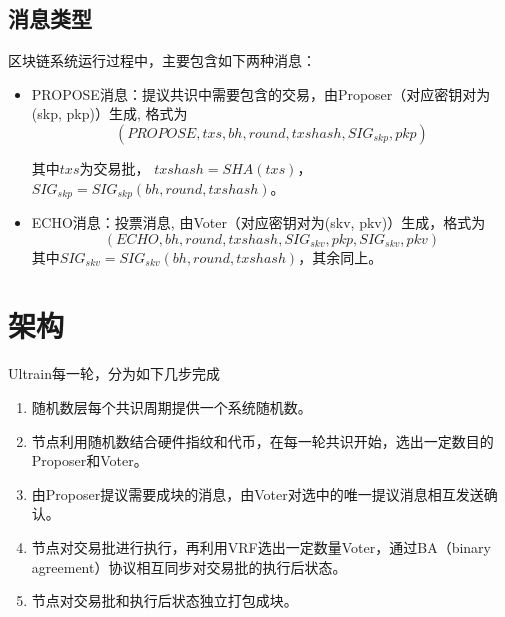 \documentclass[12pt, UTF8]{article}
\begin{document}
\subsection{消息类型}
区块链系统运行过程中，主要包含如下两种消息：
\begin{itemize}
\item PROPOSE消息：提议共识中需要包含的交易，由Proposer（对应密钥对为(skp, pkp)）生成, 格式为
\begin{equation}
(PROPOSE, txs, bh, round, txshash, SIG_{skp}, pkp)
\end{equation}

其中$txs$为交易批， $txshash=SHA(txs)$， $SIG_{skp}= SIG_{skp}(bh, round, txshash)$。
\item ECHO消息：投票消息, 由Voter（对应密钥对为(skv, pkv)）生成，格式为
\begin{equation}
(ECHO, bh, round, txshash, SIG_{skv}, pkp, SIG_{skv}, pkv)
\end{equation}
其中$SIG_{skv}= SIG_{skv}(bh, round, txshash)$，其余同上。
\end{itemize}

\section{架构}
Ultrain每一轮，分为如下几步完成
\begin{enumerate}
\item 随机数层每个共识周期提供一个系统随机数。
\item 节点利用随机数结合硬件指纹和代币，在每一轮共识开始，选出一定数目的Proposer和Voter。
\item 由Proposer提议需要成块的消息，由Voter对选中的唯一提议消息相互发送确认。
\item 节点对交易批进行执行，再利用VRF选出一定数量Voter，通过BA（binary agreement）协议相互同步对交易批的执行后状态。
\item 节点对交易批和执行后状态独立打包成块。
\end{enumerate}
\end{document}
